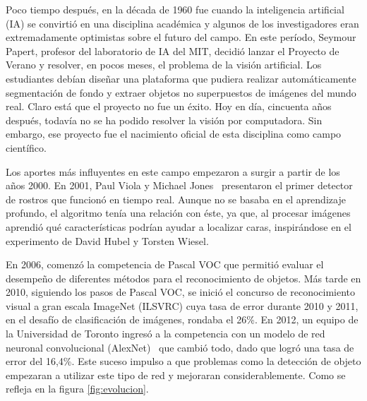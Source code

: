 Poco tiempo después, en la década de 1960 fue cuando la inteligencia artificial (IA) se convirtió en una disciplina académica y algunos de los investigadores eran extremadamente optimistas sobre el futuro del campo. En este período, Seymour Papert, profesor del laboratorio de IA del MIT, decidió lanzar el Proyecto de Verano y resolver, en pocos meses, el problema de la visión artificial. Los estudiantes debían diseñar una plataforma que pudiera realizar automáticamente segmentación de fondo y extraer objetos no superpuestos de imágenes del mundo real. Claro está que el proyecto no fue un éxito.  Hoy en día, cincuenta años después, todavía no se ha podido resolver la visión por computadora. Sin embargo, ese proyecto fue el nacimiento oficial de esta disciplina como campo científico. 

Los aportes más influyentes en este campo empezaron a surgir a partir de los años 2000. En 2001, Paul Viola y Michael Jones~\cite{viola2001rapid} presentaron el primer detector de rostros que funcionó en tiempo real. Aunque no se basaba en el aprendizaje profundo, el algoritmo tenía una relación con éste, ya que, al procesar imágenes aprendió qué características podrían ayudar a localizar caras, inspirándose en el experimento de David Hubel y Torsten Wiesel. 

En 2006, comenzó la competencia de Pascal VOC que permitió evaluar el desempeño de diferentes métodos para el reconocimiento de objetos. Más tarde en 2010, siguiendo los pasos de Pascal VOC, se inició el concurso de reconocimiento visual a gran escala ImageNet (ILSVRC) cuya tasa de error durante 2010 y 2011, en el desafío de clasificación de imágenes, rondaba el 26\%.  En 2012, un equipo de la Universidad de Toronto ingresó a la competencia con un modelo de red neuronal convolucional (AlexNet)~\cite{krizhevsky2012imagenet} que cambió todo, dado que logró una tasa de error del 16,4\%. Este suceso impulso a que problemas como la detección de objeto empezaran a utilizar este tipo de red y mejoraran considerablemente. Como se refleja en la figura \autoref{fig:evolucion}.

